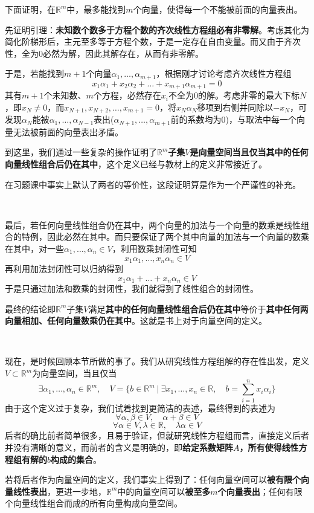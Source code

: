 \documentclass[a4paper,UTF8,fontset=windows]{ctexart}
\newcommand*{\note}{\noindent *}
\begin{document}
下面证明，在$\mathbb{R}^m$中，最多能找到$m$个向量，使得每一个不能被前面的向量表出。

先证明引理：\textbf{未知数个数多于方程个数的齐次线性方程组必有非零解}。考虑其化为简化阶梯形后，主元至多等于方程个数，于是一定存在自由变量。而又由于齐次性，全为0必然为解，因此其解存在，从而有非零解。

于是，若能找到$m+1$个向量$\alpha_1,\dots,\alpha_{m+1}$，根据刚才讨论考虑齐次线性方程组
$$x_1\alpha_1+x_2\alpha_2+\dots+x_{m+1}\alpha_{m+1}=0$$
其有$m+1$个未知数、$m$个方程，必然存在$x_i$不全为0的解。考虑非零的最大下标$N$，即$x_N\ne0$，而$x_{N+1},x_{N+2},\dots,x_{m+1}=0$，将$x_N\alpha_N$移项到右侧并同除以$-x_N$，可发现$\alpha_N$能被$\alpha_1,\dots,\alpha_{N-1}$表出($\alpha_{N+1},\dots,\alpha_{m+1}$前的系数均为0)，与取法中每一个向量无法被前面的向量表出矛盾。

到这里，我们通过一些复杂的操作证明了\textbf{$\mathbb{R}^m$子集$V$是向量空间当且仅当其中的任何向量线性组合后仍在其中}，这个定义已经与教材上的定义非常接近了。

\note 在习题课中事实上默认了两者的等价性，这段证明算是作为一个严谨性的补充。

\

最后，若任何向量线性组合仍在其中，两个向量的加法与一个向量的数乘是线性组合的特例，因此必然在其中。而只要保证了两个其中向量的加法与一个向量的数乘在其中，对一些$\alpha_1,\dots,\alpha_n\in V$，利用数乘封闭性可知
$$x_1\alpha_1,\dots,x_n\alpha_n\in V$$
再利用加法封闭性可以归纳得到
$$x_1\alpha_1+\dots+x_n\alpha_n\in V$$
于是只通过加法和数乘的封闭性，我们就得到了线性组合的封闭性。

最终的结论即$\mathbb{R}^m$子集$V$满足\textbf{其中的任何向量线性组合后仍在其中}等价于\textbf{其中任何两向量相加、任何向量数乘仍在其中}。这就是书上对于向量空间的定义。

\

现在，是时候回顾本节所做的事了。我们从研究线性方程组解的存在性出发，定义$V\subset\mathbb{R}^m$为向量空间，当且仅当
$$\exists\alpha_1,\dots,\alpha_n\in\mathbb{R}^m,\quad V=\bigg\{b\in\mathbb{R}^m\ \bigg|\ \exists x_1,\dots,x_n\in\mathbb{R},\quad b=\sum_{i=1}^nx_i\alpha_i\bigg\}$$
由于这个定义过于复杂，我们试着找到更简洁的表述，最终得到的表述为
$$\forall\alpha,\beta\in V,\quad\alpha+\beta\in V$$
$$\forall\alpha\in V,\lambda\in\mathbb{R},\quad\lambda\alpha\in V$$
后者的确比前者简单很多，且易于验证，但就研究线性方程组而言，直接定义后者并没有清晰的意义，而前者的含义是明确的，即\textbf{给定系数矩阵$A$，所有使得线性方程组有解的$b$构成的集合}。

若将后者作为向量空间的定义，我们事实上得到了：任何向量空间可以\textbf{被有限个向量线性表出}，更进一步地，$\mathbb{R}^m$中的向量空间可以\textbf{被至多$m$个向量表出}；任何有限个向量线性组合而成的所有向量构成向量空间。
\end{document}
